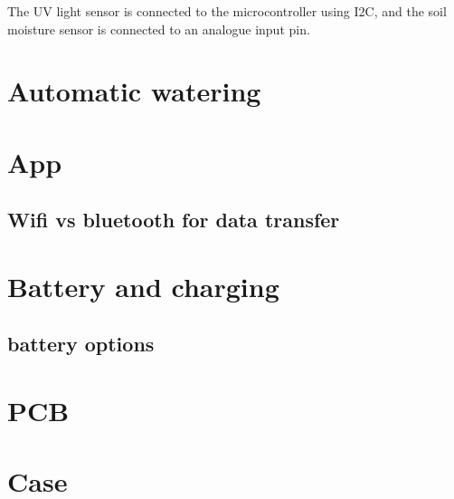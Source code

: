 The UV light sensor is connected to the microcontroller using I2C, and the soil moisture sensor is connected to an analogue input pin.

\section{Automatic watering}

\section{App}
\subsection{Wifi vs bluetooth for data transfer}

\section{Battery and charging}
\label{sec:battery}
\subsection{battery options}

\section{PCB}

\section{Case}